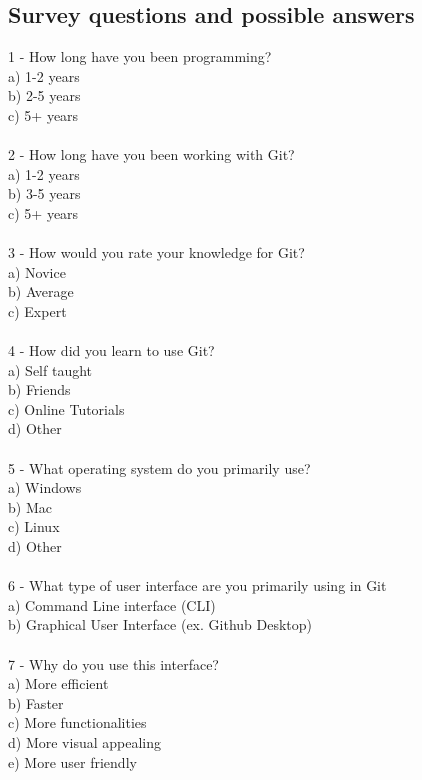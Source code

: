 \documentclass[]{report}
\begin{document}
	
	
	
	\subsection{Survey questions and possible answers}
	1 - How long have you been programming?\\
		a) 1-2 years\\
		b) 2-5 years\\
		c) 5+ years\\\\
	2 - How long have you been working with Git?\\
	a) 1-2 years\\
	b) 3-5 years\\
	c) 5+ years\\\\
	3 - How would you rate your knowledge for Git?\\
	a) Novice\\
	b) Average\\
	c) Expert\\\\
	4 - How did you learn to use Git?\\
	a) Self taught\\
	b) Friends\\
	c) Online Tutorials\\
	d) Other\\\\
	5 - What operating system do you primarily use?\\
	a) Windows\\
	b) Mac\\
	c) Linux\\
	d) Other\\\\
	6 - What type of user interface are you primarily using in Git\\
	a) Command Line interface (CLI)\\
	b) Graphical User Interface (ex. Github Desktop)\\\\
	7 - Why do you use this interface?\\
	a) More efficient\\
	b) Faster\\
	c) More functionalities\\
	d) More visual appealing\\
	e) More user friendly\\
\end{document}
